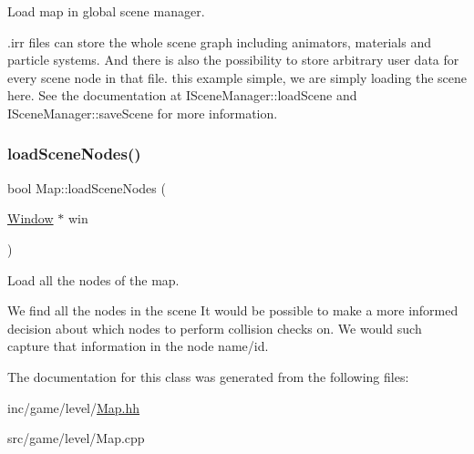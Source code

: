 Load map in global scene manager. 

.irr files can store the whole scene graph including animators, materials and particle systems. And there is also the possibility to store arbitrary user data for every scene node in that file. this example simple, we are simply loading the scene here. See the documentation at I\+Scene\+Manager\+::load\+Scene and I\+Scene\+Manager\+::save\+Scene for more information. \mbox{\label{classMap_a235c359c04ae1521d53804d029ddce92}} 
\subsubsection{\texorpdfstring{load\+Scene\+Nodes()}{loadSceneNodes()}}
{\footnotesize\ttfamily bool Map\+::load\+Scene\+Nodes (\begin{DoxyParamCaption}\item[{\hyperlink{classWindow}{Window} $\ast$}]{win }\end{DoxyParamCaption})}



Load all the nodes of the map. 

We find all the nodes in the scene It would be possible to make a more informed decision about which nodes to perform collision checks on. We would such capture that information in the node name/id. 

The documentation for this class was generated from the following files\+:\begin{DoxyCompactItemize}
\item 
inc/game/level/\hyperlink{Map_8hh}{Map.\+hh}\item 
src/game/level/Map.\+cpp\end{DoxyCompactItemize}
